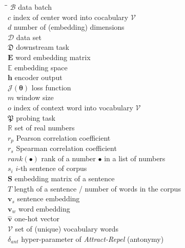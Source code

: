 \begin{tabbing}
	\hspace*{2mm}\=\hspace*{2.15cm}\=\kill
	\> $\mathcal{B}$				\>	data batch									\\[3mm]
	\> $c$						\>	index of center word into cocabulary $\mathcal{V}$	\\[3mm]
	\> $d$ 						\>	number of (embedding) dimensions				\\[3mm]
	\> $\mathcal{D}$				\>	data set									\\[3mm]
	\> $\mathfrak{D}$				\>	downstream task							\\[3mm]
	\> $\bm{E}$					\> 	word embedding matrix						\\[3mm]
	\> $\mathbb{E}$				\>	embedding space							\\[3mm]
	\> $\bm{h}$					\>	encoder output								\\[3mm]
	\> $\mathcal{J}(\bm{\theta})$		\>	loss function								\\[3mm]
	\> $m$						\>	window size								\\[3mm]
	\> $o$						\>	index of context word into vocabulary $\mathcal{V}$	\\[3mm]
	\> $\mathfrak{P}$				\>	probing task								\\[3mm]
	\> $\mathbb{R}$				\>	set of real numbers							\\[3mm]
	\> $r_p$						\>	Pearson correlation coefficient					\\[3mm]
	\> $r_s$						\>	Spearman correlation coefficient					\\[3mm]
	\> $rank(\bullet)$				\>	rank of a number $\bullet$ in a list of numbers		\\[3mm]
	\> $s_i$ 						\> 	$i$-th sentence of corpus						\\[3mm]
	\> $\bm{S}$					\>	embedding matrix of a sentence					\\[3mm]
	\> $T$						\>	length of a sentence / number of words in the corpus	\\[3mm]
	\> $\bm{v}_s$					\>	sentence embedding							\\[3mm]
	\> $\bm{v}_w$					\>	word embedding							\\[3mm]
	\> $\widehat{\bm{v}}$			\>	one-hot vector								\\[3mm]
	\> $\mathcal{V}$				\>	set of (unique) vocabulary words					\\[3mm]
	\> $\delta_{ant}$				\>	hyper-parameter of \textit{Attract-Repel} (antonymy)	\\[3mm]

\end{tabbing}
